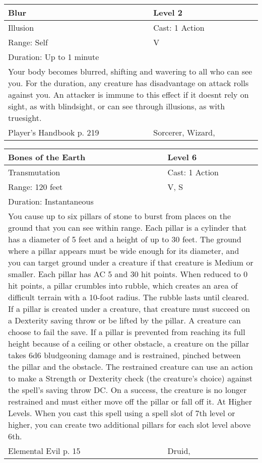 \documentclass[11pt]{report}
\begin{document}
\begin{table}[H]
	\begin{tabular}{||p{6cm}|p{6cm}||}
		\hline\hline
		\bf{Blur} & Level 2\\ \hline
		Illusion & Cast: 1 Action\\ \hline
		Range: Self & V\\ \hline
		Duration: Up to 1 minute & \\ \hline
		\multicolumn{2}{||p{12cm}||}{Your body becomes blurred, shifting and wavering to all who can see you. For the duration, any creature has disadvantage on attack rolls against you. An attacker is immune to this effect if it doesnt rely on sight, as with blindsight, or can see through illusions, as with truesight.}\\ \hline
Player's Handbook p. 219 & Sorcerer, Wizard, \\ \hline\hline
	\end{tabular}
\end{table}

\begin{table}[H]
	\begin{tabular}{||p{6cm}|p{6cm}||}
		\hline\hline
		\bf{Bones of the Earth} & Level 6\\ \hline
		Transmutation & Cast: 1 Action\\ \hline
		Range: 120 feet & V, S\\ \hline
		Duration: Instantaneous & \\ \hline
		\multicolumn{2}{||p{12cm}||}{You cause up to six pillars of stone to burst from places on the ground that you can see within range. Each pillar is a cylinder that has a diameter of 5 feet and a height of up to 30 feet. The ground where a pillar appears must be wide enough for its diameter, and you can target ground under a creature if that creature is Medium or smaller. Each pillar has AC 5 and 30 hit points. When reduced to 0 hit points, a pillar crumbles into rubble, which creates an area of difficult terrain with a 10-foot radius. The rubble lasts until cleared.
If a pillar is created under a creature, that creature must succeed on a Dexterity saving throw or be lifted by the pillar. A creature can choose to fail the save.
If a pillar is prevented from reaching its full height because of a ceiling or other obstacle, a creature on the pillar takes 6d6 bludgeoning damage and is restrained, pinched between the pillar and the obstacle. The restrained creature can use an action to make a Strength or Dexterity check (the creature’s choice) against the spell’s saving throw DC. On a success, the creature is no longer restrained and must either move off the pillar or fall off it.
At Higher Levels. When you cast this spell using a spell slot of 7th level or higher, you can create two additional pillars for each slot level above 6th.}\\ \hline
Elemental Evil p. 15 & Druid, \\ \hline\hline
	\end{tabular}
\end{table}
\end{document}
